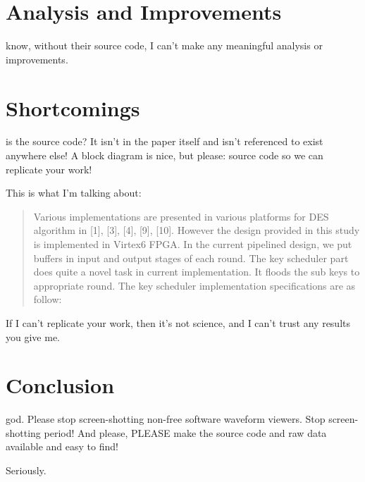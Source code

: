 \documentclass[journal,twocolumn]{IEEEtran}
\begin{document}
\section{Analysis and Improvements}

 know, without their source code, I can't make any
meaningful analysis or improvements.

\section{Shortcomings}

 is the source code? It isn't in the paper itself and
isn't referenced to exist anywhere else! A block diagram is nice, but please:
source code so we can replicate your work!

This is what I'm talking about:

\begin{quote}
Various implementations are presented in various
platforms for DES algorithm in [1], [3], [4], [9], [10].
However the design provided in this study is implemented
in Virtex6 FPGA. In the current pipelined design, we put
buffers in input and output stages of each round. The key
scheduler part does quite a novel task in current
implementation. It floods the sub keys to appropriate round.
The key scheduler implementation specifications are as
follow: 
\end{quote}

If I can't replicate your work, then it's not science, and I can't trust 
any results you give me.

\section{Conclusion}

 god. Please stop screen-shotting non-free software
waveform viewers. Stop screen-shotting period! And please, PLEASE make the
source code and raw data available and easy to find!

Seriously.



\end{document}
